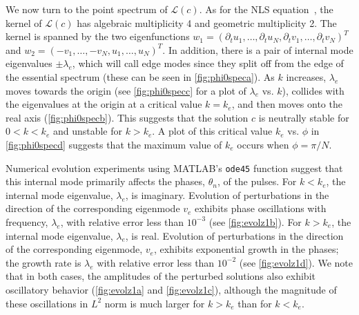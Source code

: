 \documentclass[11pt,reqno]{amsart}
\def\calL{{\mathcal L}}
\begin{document}
We now turn to the point spectrum of $\calL(c)$. As for the NLS equation~\cite[Chapter 2.1.1.1]{Kevrekidis2009},
the kernel of $\calL(c)$ has algebraic multiplicity 4 and geometric multiplicity 2. The kernel is spanned by the two eigenfunctions 
$w_1 = (\partial_t u_1, \dots, \partial_t u_N, \partial_t v_1, \dots, \partial_t v_N )^T$ and 
$w_2 = (-v_1, \dots, -v_N, u_1, \dots, u_N )^T$. In addition, there is a pair of internal mode eigenvalues $\pm \lambda_e$, which will call edge modes since they split off from the edge of the essential spectrum (these can be seen in \cref{fig:phi0speca}). As $k$ increases, $\lambda_e$ moves towards the origin (see \cref{fig:phi0specc} for a plot of $\lambda_e$ vs. $k$), collides with the eigenvalues at the origin at a critical value $k = k_e$, and then moves onto the real axis (\cref{fig:phi0specb}). This suggests that the solution $c$ is neutrally stable for $0 < k < k_e$ and unstable for $k > k_e$. A plot of this critical value $k_e$ vs. $\phi$ in \cref{fig:phi0specd} suggests that the maximum value of $k_e$ occurs when $\phi = \pi/N$.

Numerical evolution experiments using MATLAB's \texttt{ode45} function suggest that this internal mode primarily affects the phases, $\theta_n$, of the pulses. For $k < k_e$, the internal mode eigenvalue, $\lambda_e$, is imaginary. Evolution of perturbations in the direction of the corresponding eigenmode $v_e$ exhibits phase oscillations with frequency, $\lambda_e$, with relative error less than $10^{-3}$ (see \cref{fig:evolz1b}). For $k > k_e$, the internal mode eigenvalue, $\lambda_e$, is real. Evolution of perturbations in the direction of the corresponding eigenmode, $v_e$, exhibits exponential growth in the phases; the growth rate is $\lambda_e$ with relative error less than $10^{-2}$ (see \cref{fig:evolz1d}). We note that in both cases, the amplitudes of the perturbed solutions also exhibit oscillatory behavior (\cref{fig:evolz1a} and \cref{fig:evolz1c}), although the magnitude of these oscillations in $L^2$ norm is much larger for $k > k_e$ than for $k < k_e$.
\end{document}
